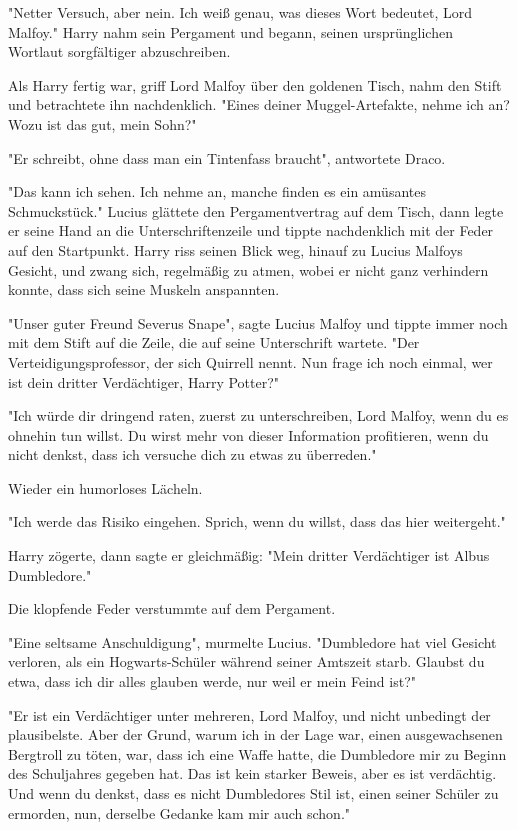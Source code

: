 {"Netter Versuch, aber nein. Ich weiß genau, was dieses Wort bedeutet, Lord Malfoy." Harry nahm sein Pergament und begann, seinen ursprünglichen Wortlaut sorgfältiger abzuschreiben.

Als Harry fertig war, griff Lord Malfoy über den goldenen Tisch, nahm den Stift und betrachtete ihn nachdenklich. "Eines deiner Muggel-Artefakte, nehme ich an? Wozu ist das gut, mein Sohn?"

"Er schreibt, ohne dass man ein Tintenfass braucht", antwortete Draco.

"Das kann ich sehen. Ich nehme an, manche finden es ein amüsantes Schmuckstück." Lucius glättete den Pergamentvertrag auf dem Tisch, dann legte er seine Hand an die Unterschriftenzeile und tippte nachdenklich mit der Feder auf den Startpunkt. Harry riss seinen Blick weg, hinauf zu Lucius Malfoys Gesicht, und zwang sich, regelmäßig zu atmen, wobei er nicht ganz verhindern konnte, dass sich seine Muskeln anspannten.

"Unser guter Freund Severus Snape", sagte Lucius Malfoy und tippte immer noch mit dem Stift auf die Zeile, die auf seine Unterschrift wartete. "Der Verteidigungsprofessor, der sich Quirrell nennt. Nun frage ich noch einmal, wer ist dein dritter Verdächtiger, Harry Potter?"

"Ich würde dir dringend raten, zuerst zu unterschreiben, Lord Malfoy, wenn du es ohnehin tun willst. Du wirst mehr von dieser Information profitieren, wenn du nicht denkst, dass ich versuche dich zu etwas zu überreden."

Wieder ein humorloses Lächeln.

"Ich werde das Risiko eingehen. Sprich, wenn du willst, dass das hier weitergeht."

Harry zögerte, dann sagte er gleichmäßig: "Mein dritter Verdächtiger ist Albus Dumbledore."

Die klopfende Feder verstummte auf dem Pergament.

"Eine seltsame Anschuldigung", murmelte Lucius. "Dumbledore hat viel Gesicht verloren, als ein Hogwarts-Schüler während seiner Amtszeit starb. Glaubst du etwa, dass ich dir alles glauben werde, nur weil er mein Feind ist?"

"Er ist ein Verdächtiger unter mehreren, Lord Malfoy, und nicht unbedingt der plausibelste. Aber der Grund, warum ich in der Lage war, einen ausgewachsenen Bergtroll zu töten, war, dass ich eine Waffe hatte, die Dumbledore mir zu Beginn des Schuljahres gegeben hat. Das ist kein starker Beweis, aber es ist verdächtig. Und wenn du denkst, dass es nicht Dumbledores Stil ist, einen seiner Schüler zu ermorden, nun, derselbe Gedanke kam mir auch schon."

}
